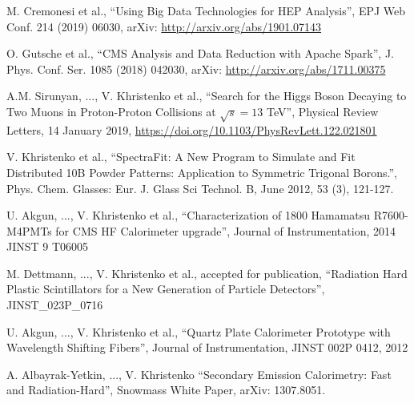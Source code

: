 \documentclass[10pt, letterpaper]{deps1}
\begin{document}
\small{\begin{tightitemize}
    \item M. Cremonesi et al., ``Using Big Data Technologies for HEP Analysis'', EPJ Web Conf. 214 (2019) 06030, arXiv: \url{http://arxiv.org/abs/1901.07143}
    \item O. Gutsche et al., ``CMS Analysis and Data Reduction with Apache Spark'', J. Phys. Conf. Ser. 1085 (2018) 042030, arXiv: \url{http://arxiv.org/abs/1711.00375}
    \item A.M. Sirunyan, ..., V. Khristenko et al., ``Search for the Higgs Boson Decaying to Two Muons in Proton-Proton Collisions at $\sqrt{s}=13$ TeV'', Physical Review Letters, 14 January 2019, \url{https://doi.org/10.1103/PhysRevLett.122.021801}
    \item V. Khristenko et al., ``SpectraFit: A New Program to Simulate and Fit Distributed 10B Powder Patterns: Application to Symmetric Trigonal Borons.'', Phys. Chem. Glasses: Eur. J. Glass Sci Technol. B, June 2012, 53 (3), 121-127.
    \item U. Akgun, ..., V. Khristenko et al., ``Characterization of 1800 Hamamatsu R7600-M4PMTs for CMS HF Calorimeter upgrade'', Journal of Instrumentation, 2014 JINST 9 T06005
    \item M. Dettmann, ..., V. Khristenko et al., accepted for publication, ``Radiation Hard Plastic Scintillators for a New Generation of Particle Detectors'', JINST\_023P\_0716
    \item U. Akgun, ..., V. Khristenko et al., ``Quartz Plate Calorimeter Prototype with Wavelength Shifting Fibers'', Journal of Instrumentation, JINST 002P 0412, 2012
    \item A. Albayrak-Yetkin, ..., V. Khristenko ``Secondary Emission Calorimetry: Fast and Radiation-Hard'', Snowmass White Paper, arXiv: 1307.8051.
\end{tightitemize}}
\end{document}
